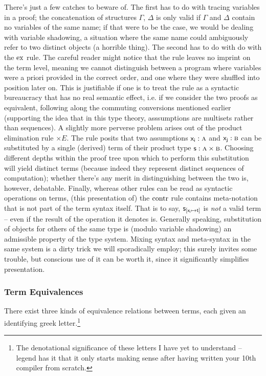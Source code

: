 There's just a few catches to beware of.
The first has to do with tracing variables in a proof; the concatenation of structures $\Gamma$, $\Delta$ is only valid if $\Gamma$ and $\Delta$ contain no variables of the same name; if that were to be the case, we would be dealing with variable shadowing, a situation where the same name could ambiguously refer to two distinct objects (a horrible thing).
The second has to do with do with the $\mathrm{ex}{}$ rule. 
The careful reader might notice that the rule leaves no imprint on the term level, meaning we cannot distinguish between a program where variables were a priori provided in the correct order, and one where they were shuffled into position later on.
This is justifiable if one is to treat the rule as a syntactic bureaucracy that has no real semantic effect, i.e. if we consider the two proofs as equivalent, following along the commuting conversions mentioned earlier (supporting the idea that in this type theory, asssumptions are multisets rather than sequences).
A slightly more perverse problem arises out of the product elimination rule $\times E$.
The rule posits that two assumptions $\smallterm{x_i }: \smallprop{A}$ and $\smallterm{x_j}: \smallprop{B}$ can be substituted by a single (derived) term of their product type $\smallterm{s}: \smallprop{A}\times\smallprop{B}$. 
Choosing different depths within the proof tree upon which to perform this substitution will yield distinct terms (because indeed they represent distinct sequences of computation); whether there's any merit in distinguishing between the two is, however, debatable.
Finally, whereas other rules can be read as syntactic operations on terms, (this presentation of) the $\mathrm{contr}{}$ rule contains meta-notation that is not part of the term syntax itself.
That is to say, $\mathsf{s}_{[\mathsf{x_i } \mapsto \mathsf{t}]}$ is \textit{not} a valid term -- even if the result of the operation it denotes is.
Generally speaking, substitution of objects for others of the same type is (modulo variable shadowing) an admissible property of the type system.
Mixing syntax and meta-syntax in the same system is a dirty trick we will sporadically employ; this surely invites some trouble, but conscious use of it can be worth it, since it significantly simplifies presentation.

\subsubsection{Term Equivalences}
There exist three kinds of equivalence relations between terms, each given an identifying greek letter.\footnote{The denotational significance of these letters I have yet to understand -- legend has it that it only starts making sense after having written your 10th compiler from scratch.}

